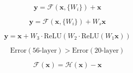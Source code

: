 
\begin{equation}
\mathbf{y} = \mathcal{F}(\mathbf{x}, \{W_i\}) + \mathbf{x}
\end{equation}

\begin{equation}
\mathbf{y} = \mathcal{F}(\mathbf{x}, \{W_i\}) + W_s \mathbf{x}
\end{equation}

\begin{equation}
\mathbf{y} = \mathbf{x} + W_3 \cdot \text{ReLU}(W_2 \cdot \text{ReLU}(W_1 \mathbf{x}))
\end{equation}

\begin{equation}
\text{Error}(56\text{-layer}) > \text{Error}(20\text{-layer})
\end{equation}

\begin{equation}
\mathcal{F}(\mathbf{x}) = \mathcal{H}(\mathbf{x}) - \mathbf{x}
\end{equation}